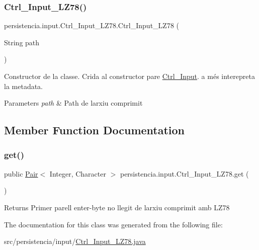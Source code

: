 \subsubsection{\texorpdfstring{Ctrl\+\_\+\+Input\+\_\+\+L\+Z78()}{Ctrl\_Input\_LZ78()}}
{\footnotesize\ttfamily persistencia.\+input.\+Ctrl\+\_\+\+Input\+\_\+\+L\+Z78.\+Ctrl\+\_\+\+Input\+\_\+\+L\+Z78 (\begin{DoxyParamCaption}\item[{String}]{path }\end{DoxyParamCaption})\hspace{0.3cm}{\ttfamily [inline]}}



Constructor de la classe. Crida al constructor pare \hyperlink{classpersistencia_1_1input_1_1Ctrl__Input}{Ctrl\+\_\+\+Input}. a més interepreta la metadata. 


\begin{DoxyParams}{Parameters}
{\em path} & Path de l\textquotesingle{}arxiu comprimit \\
\hline
\end{DoxyParams}


\subsection{Member Function Documentation}
\mbox{\label{classpersistencia_1_1input_1_1Ctrl__Input__LZ78_ae09535962f284be3a76369845c15b78c}} 
\subsubsection{\texorpdfstring{get()}{get()}}
{\footnotesize\ttfamily public \hyperlink{classdomini_1_1utils_1_1Pair}{Pair}$<$ Integer, Character $>$ persistencia.\+input.\+Ctrl\+\_\+\+Input\+\_\+\+L\+Z78.\+get (\begin{DoxyParamCaption}{ }\end{DoxyParamCaption})\hspace{0.3cm}{\ttfamily [inline]}}

\begin{DoxyReturn}{Returns}
Primer parell enter-\/byte no llegit de l\textquotesingle{}arxiu comprimit amb L\+Z78 
\end{DoxyReturn}


The documentation for this class was generated from the following file\+:\begin{DoxyCompactItemize}
\item 
src/persistencia/input/\hyperlink{Ctrl__Input__LZ78_8java}{Ctrl\+\_\+\+Input\+\_\+\+L\+Z78.\+java}\end{DoxyCompactItemize}
